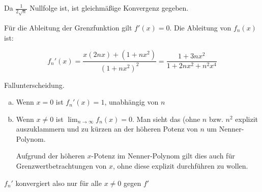 \documentclass[a4paper,german,12pt,smallheadings]{scrartcl}
\begin{document}
Da $\frac{1}{2\sqrt{n}}$ Nullfolge ist, ist gleichmäßige Konvergenz gegeben.

Für die Ableitung der Grenzfunktion gilt $f'(x) = 0$. Die Ableitung von $f_n(x)$ ist:

\begin{equation*}
  f_n'(x) = \frac{x(2nx) + (1+nx^2)}{(1+nx^2)^2} = \frac{1+ 3nx^2}{1+2nx^2 + n^2x^4}
\end{equation*}

Fallunterscheidung.

\begin{enumerate}[a)]
  \item
    Wenn $x=0$ ist $f_n'(x) = 1$, unabhängig von $n$

  \item
    Wenn $x\neq0$ ist $\lim_{n \to \infty} f_n(x) = 0$. Man sieht das (ohne
    $n$ bzw. $n^2$ explizit auszuklammern und zu kürzen an der höheren Potenz
    von $n$ um Nenner-Polynom.

    Aufgrund der höheren $x$-Potenz im Nenner-Polynom gilt dies auch für
    Grenzwertbetrachtungen von $x$, ohne diese explizit durchführen zu wollen.
\end{enumerate}

$f_n'$ konvergiert also nur für alle $x \neq 0$ gegen $f'$
\end{document}
